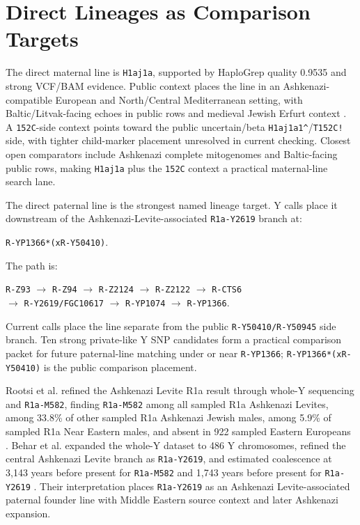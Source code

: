 \documentclass[11pt]{article}
\begin{document}
\section{Direct Lineages as Comparison Targets}

The direct maternal line is \texttt{H1aj1a}, supported by HaploGrep quality 0.9535 and strong VCF/BAM evidence. Public context places the line in an Ashkenazi-compatible European and North/Central Mediterranean setting, with Baltic/Litvak-facing echoes in public rows and medieval Jewish Erfurt context \citep{costa2013}. A \texttt{152C}-side context points toward the public uncertain/beta \texttt{H1aj1a1\textasciicircum{}}/\texttt{T152C!} side, with tighter child-marker placement unresolved in current checking. Closest open comparators include Ashkenazi complete mitogenomes and Baltic-facing public rows, making \texttt{H1aj1a} plus the \texttt{152C} context a practical maternal-line search lane.

The direct paternal line is the strongest named lineage target. Y calls place it downstream of the Ashkenazi-Levite-associated \texttt{R1a-Y2619} branch at:

\begin{center}
\small
\texttt{R-YP1366*(xR-Y50410)}.
\end{center}

The path is:

\begin{center}
\small
\texttt{R-Z93} $\rightarrow$ \texttt{R-Z94} $\rightarrow$ \texttt{R-Z2124} $\rightarrow$ \texttt{R-Z2122} $\rightarrow$ \texttt{R-CTS6}\\
$\rightarrow$ \texttt{R-Y2619/FGC10617} $\rightarrow$ \texttt{R-YP1074} $\rightarrow$ \texttt{R-YP1366}.
\end{center}

Current calls place the line separate from the public \texttt{R-Y50410/R-Y50945} side branch. Ten strong private-like Y SNP candidates form a practical comparison packet for future paternal-line matching under or near \texttt{R-YP1366}; \texttt{R-YP1366*(xR-Y50410)} is the public comparison placement.

Rootsi et al. refined the Ashkenazi Levite R1a result through whole-Y sequencing and \texttt{R1a-M582}, finding \texttt{R1a-M582} among all sampled R1a Ashkenazi Levites, among 33.8\% of other sampled R1a Ashkenazi Jewish males, among 5.9\% of sampled R1a Near Eastern males, and absent in 922 sampled Eastern Europeans \citep{rootsi2013}. Behar et al. expanded the whole-Y dataset to 486 Y chromosomes, refined the central Ashkenazi Levite branch as \texttt{R1a-Y2619}, and estimated coalescence at 3,143 years before present for \texttt{R1a-M582} and 1,743 years before present for \texttt{R1a-Y2619} \citep{behar2017}. Their interpretation places \texttt{R1a-Y2619} as an Ashkenazi Levite-associated paternal founder line with Middle Eastern source context and later Ashkenazi expansion.
\end{document}
